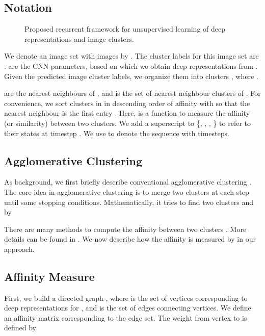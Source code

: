 \documentclass[10pt,twocolumn,letterpaper]{article}
\begin{document}
{\subsection{Notation}
\begin{figure}[t]
   \begin{minipage}{1.0\linewidth}
   \centering
   \end{minipage}
   \vspace{-10pt}
   \caption{Proposed recurrent framework for unsupervised learning of deep representations and image clusters.}
   \label{Fig_Framework}
\end{figure}
We denote an image set with  images by . {The cluster labels for this image set are .}  are the CNN parameters, based on which we obtain deep representations  from . Given the predicted {image cluster labels}, we organize them into  clusters , {where }. { are the  nearest neighbours of , and  is the set of  nearest neighbour clusters of . For convenience, we sort clusters in  in descending order of affinity with  so that the nearest neighbour  is the first entry . Here,  is a function to measure the affinity (or similarity) between two clusters. We add a superscript  to \{, , , \} to refer to their states at timestep . We use  to denote the {sequence}  with  timesteps.

\subsection{Agglomerative Clustering}
As background, we first briefly describe conventional agglomerative clustering \cite{gowda1978agglomerative,kurita1991efficient}. The core idea in agglomerative clustering is {to merge} two clusters at each step until some stopping conditions. Mathematically, it tries to find two clusters  and  by


There are many methods to compute the affinity between two clusters \cite{gowda1978agglomerative, kurita1991efficient,navarro1997universal,zhao2009cyclizing,zhang2012graph}. More details can be found in \cite{jain1999data}. We now describe how the affinity is measured by  in our approach.

\subsection{Affinity Measure}
{First}, we build a directed graph {}, where  is the set of vertices corresponding to {deep representations  for }, and  is the set of edges connecting vertices. We define an affinity matrix  {corresponding to the edge set}. The weight from vertex  to  is defined by

}}
\end{document}
